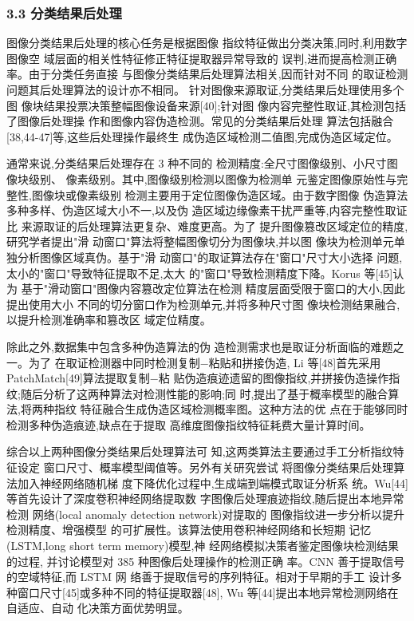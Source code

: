 \documentclass{article}
\begin{document}
\subsubsection{\textbf{3.3} 分类结果后处理}

图像分类结果后处理的核心任务是根据图像 指纹特征做出分类决策,同时,利用数字图像空 域层面的相关性特征修正特征提取器异常导致的 误判,进而提高检测正确率。由于分类任务直接 与图像分类结果后处理算法相关,因而针对不同 的取证检测问题其后处理算法的设计亦不相同。 针对图像来源取证,分类结果后处理使用多个图 像块结果投票决策整幅图像设备来源[40];针对图 像内容完整性取证,其检测包括了图像后处理操 作和图像内容伪造检测。常见的分类结果后处理 算法包括融合[38,44-47]等,这些后处理操作最终生 成伪造区域检测二值图,完成伪造区域定位。

通常来说,分类结果后处理存在 3 种不同的 检测精度:全尺寸图像级别、小尺寸图像块级别、 像素级别。其中,图像级别检测以图像为检测单 元鉴定图像原始性与完整性,图像块或像素级别 检测主要用于定位图像伪造区域。由于数字图像 伪造算法多种多样、伪造区域大小不一,以及伪 造区域边缘像素干扰严重等,内容完整性取证比 来源取证的后处理算法更复杂、难度更高。为了 提升图像篡改区域定位的精度,研究学者提出"滑 动窗口"算法将整幅图像切分为图像块,并以图 像块为检测单元单独分析图像区域真伪。基于"滑 动窗口"的取证算法存在"窗口"尺寸大小选择 问题,太小的"窗口"导致特征提取不足,太大 的"窗口"导致检测精度下降。Korus 等[45]认为 基于"滑动窗口"图像内容篡改定位算法在检测 精度层面受限于窗口的大小,因此提出使用大小 不同的切分窗口作为检测单元,并将多种尺寸图 像块检测结果融合,以提升检测准确率和篡改区 域定位精度。

除此之外,数据集中包含多种伪造算法的伪 造检测需求也是取证分析面临的难题之一。为了 在取证检测器中同时检测复制−粘贴和拼接伪造, Li 等[48]首先采用 PatchMatch[49]算法提取复制−粘 贴伪造痕迹遗留的图像指纹,并拼接伪造操作指 纹;随后分析了这两种算法对检测性能的影响;同 时,提出了基于概率模型的融合算法,将两种指纹 特征融合生成伪造区域检测概率图。这种方法的优 点在于能够同时检测多种伪造痕迹,缺点在于提取 高维度图像指纹特征耗费大量计算时间。

综合以上两种图像分类结果后处理算法可 知,这两类算法主要通过手工分析指纹特征设定 窗口尺寸、概率模型阈值等。另外有关研究尝试 将图像分类结果后处理算法加入神经网络随机梯 度下降优化过程中,生成端到端模式取证分析系 统。Wu[44]等首先设计了深度卷积神经网络提取数 字图像后处理痕迹指纹,随后提出本地异常检测 网络(local anomaly detection network)对提取的 图像指纹进一步分析以提升检测精度、增强模型 的可扩展性。该算法使用卷积神经网络和长短期 记忆(LSTM,long short term memory)模型,神 经网络模拟决策者鉴定图像块检测结果的过程, 并讨论模型对 385 种图像后处理操作的检测正确 率。CNN 善于提取信号的空域特征,而 LSTM 网 络善于提取信号的序列特征。相对于早期的手工 设计多种窗口尺寸[45]或多种不同的特征提取器[48], Wu 等[44]提出本地异常检测网络在自适应、自动 化决策方面优势明显。
\end{document}
